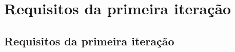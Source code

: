 \part{Requisitos da primeira iteração}
\chapter[Requisitos da primeira iteração]{Requisitos da primeira iteração}